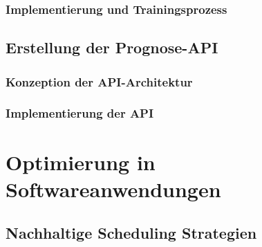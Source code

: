\subsection{Implementierung und Trainingsprozess}
\section{Erstellung der Prognose-API}
\subsection{Konzeption der API-Architektur}
\subsection{Implementierung der API}

\chapter{Optimierung in Softwareanwendungen}
\section{Nachhaltige Scheduling Strategien}

